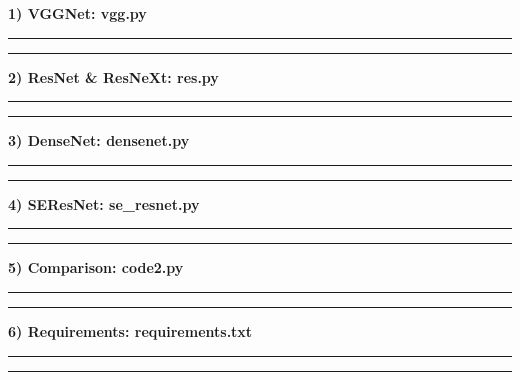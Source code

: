 \documentclass[a4paper]{article}
\newcommand{\HRule}{\rule{\linewidth}{0.5mm}}
\begin{document}
\vspace{5mm}

\noindent \normalsize \textbf{1) \textsf{VGGNet}: vgg.py} \small

\noindent \HRule



\noindent \HRule

\vspace{1.5cm}

\noindent \normalsize \textbf{2) \textsf{ResNet} \& \textsf{ResNeXt}: res.py} \small

\noindent \HRule



\noindent \HRule

\vspace{1.5cm}

\noindent \normalsize \textbf{3) \textsf{DenseNet}: densenet.py} \small

\noindent \HRule

 

\noindent \HRule

\vspace{1.5cm}

\noindent \normalsize \textbf{4) \textsf{SEResNet}: se\_resnet.py} \small

\noindent \HRule

 

\noindent \HRule

\vspace{1.5cm}

\noindent \normalsize \textbf{5) \textsf{Comparison}: code2.py} \small

\noindent \HRule

 

\noindent \HRule

\vspace{1.5cm}

\noindent \normalsize \textbf{6) \textsf{Requirements}: requirements.txt} \small

\noindent \HRule

 

\noindent \HRule

\vspace{2cm}
\end{document}
